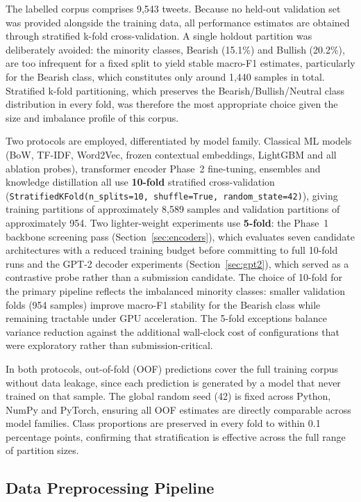 \documentclass[11pt,a4paper]{article}
\begin{document}
The labelled corpus comprises 9{,}543 tweets. Because no held-out validation set was
provided alongside the training data, all performance estimates are obtained through
stratified k-fold cross-validation. A single holdout partition was deliberately avoided:
the minority classes, Bearish (15.1\%) and Bullish (20.2\%), are too infrequent for a
fixed split to yield stable macro-F1 estimates, particularly for the Bearish class, which
constitutes only around 1{,}440 samples in total. Stratified k-fold partitioning, which
preserves the Bearish/Bullish/Neutral class distribution in every fold, was therefore the
most appropriate choice given the size and imbalance profile of this corpus.

Two protocols are employed, differentiated by model family. Classical ML models (BoW,
TF-IDF, Word2Vec, frozen contextual embeddings, LightGBM and all ablation probes),
transformer encoder Phase~2 fine-tuning, ensembles and knowledge distillation all use
\textbf{10-fold} stratified cross-validation
(\texttt{StratifiedKFold(n\_splits=10, shuffle=True, random\_state=42)}), giving training
partitions of approximately 8{,}589 samples and validation partitions of approximately
954. Two lighter-weight experiments use \textbf{5-fold}: the Phase~1 backbone screening
pass (Section~\ref{sec:encoders}), which evaluates seven candidate architectures with a
reduced training budget before committing to full 10-fold runs and the GPT-2 decoder
experiments (Section~\ref{sec:gpt2}), which served as a contrastive probe rather than a
submission candidate. The choice of 10-fold for the primary pipeline reflects the
imbalanced minority classes: smaller validation folds (954 samples) improve macro-F1
stability for the Bearish class while remaining tractable under GPU acceleration. The
5-fold exceptions balance variance reduction against the additional wall-clock cost of
configurations that were exploratory rather than submission-critical.

In both protocols, out-of-fold (OOF) predictions cover the full training corpus without
data leakage, since each prediction is generated by a model that never trained on that
sample. The global random seed (42) is fixed across Python, NumPy and PyTorch, ensuring
all OOF estimates are directly comparable across model families. Class proportions are
preserved in every fold to within 0.1 percentage points, confirming that stratification
is effective across the full range of partition sizes.

\subsection{Data Preprocessing Pipeline}
\end{document}
